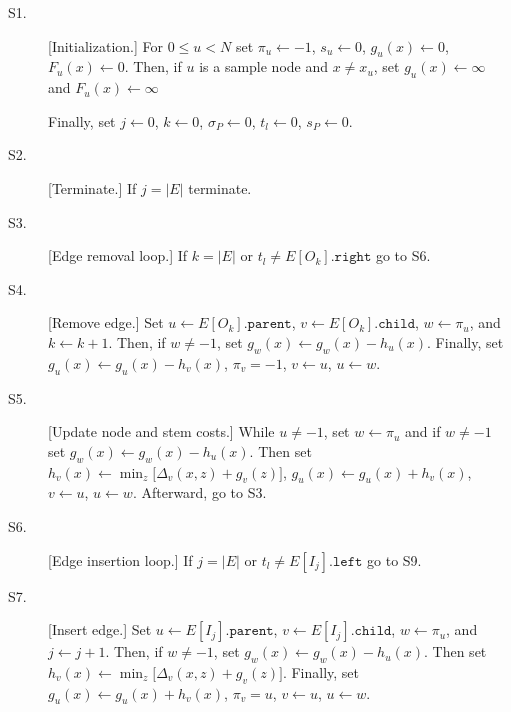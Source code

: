 \begin{description}

\item[S1.] [Initialization.]
    For $0 \leq u < N$
        set $\pi_u \leftarrow -1$,
        $s_u \leftarrow 0$,
        $g_u(x) \leftarrow 0$,
        $F_u(x) \leftarrow 0$.
        Then,
        if $u$ is a sample node and $x \neq x_u$,
            set $g_u(x) \leftarrow \infty$ and $F_u(x) \leftarrow \infty$

    Finally,
        set $j \leftarrow 0$,
        $k \leftarrow 0$,
        $\sigma_P \leftarrow 0$,
        $t_l \leftarrow 0$,
        $s_P \leftarrow 0$.

\item[S2.] [Terminate.]
    If $j = |E|$ terminate.

\item[S3.] [Edge removal loop.]
    If $k = |E|$ or $t_l \neq E[O_k].\texttt{right}$ go to S6.

\item[S4.] [Remove edge.]
    Set $u \leftarrow E[O_k].\texttt{parent}$,
        $v \leftarrow E[O_k].\texttt{child}$,
        $w \leftarrow \pi_u$, and
        $k \leftarrow k + 1$.
        Then,
        if $w \neq -1$,
            set $g_w(x) \leftarrow g_w(x) - h_u(x)$.
        Finally,
        set $g_u(x) \leftarrow g_u(x) - h_v(x)$,
        $\pi_v = -1$,
        $v \leftarrow u$,
        $u \leftarrow w$.

\item[S5.] [Update node and stem costs.]
    While $u \neq -1$,
        set $w \leftarrow \pi_u$ and
        if $w \neq -1$
            set $g_w(x) \leftarrow g_w(x) - h_u(x)$.
        Then set
        $h_v(x) \leftarrow \min_{z}\bigl[\Delta_v(x,z) + g_v(z)\bigr]$,
        $g_u(x) \leftarrow g_u(x) + h_v(x)$,
        $v \leftarrow u$, $u \leftarrow w$.
    Afterward, go to S3.

\item[S6.] [Edge insertion loop.]
    If $j = |E|$ or $t_l \neq E[I_j].\texttt{left}$ go to S9.

\item[S7.] [Insert edge.]
    Set $u \leftarrow E[I_j].\texttt{parent}$,
        $v \leftarrow E[I_j].\texttt{child}$,
        $w \leftarrow \pi_u$, and
        $j \leftarrow j + 1$.
        Then,
        if $w \neq -1$,
            set $g_w(x) \leftarrow g_w(x) - h_u(x)$.
        Then set
        $h_v(x) \leftarrow \min_{z}\bigl[\Delta_v(x,z) + g_v(z)\bigr]$.
        Finally,
        set $g_u(x) \leftarrow g_u(x) + h_v(x)$,
        $\pi_v = u$,
        $v \leftarrow u$,
        $u \leftarrow w$.


\end{description}
